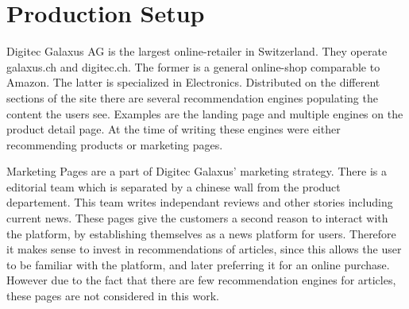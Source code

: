 \section{Production Setup}
Digitec Galaxus AG is the largest online-retailer in Switzerland.
They operate galaxus.ch and digitec.ch. The former is a general online-shop comparable to Amazon. 
The latter is specialized in Electronics.
Distributed on the different sections of the site there are several recommendation engines populating the content the users see.
Examples are the landing page and multiple engines on the product detail page.
At the time of writing these engines were either recommending products or marketing pages. 
\par
Marketing Pages are a part of Digitec Galaxus' marketing strategy.
There is a editorial team which is separated by a chinese wall from the product departement.
This team writes independant reviews and other stories including current news.
These pages give the customers a second reason to interact with the platform, by establishing themselves as a news platform for users.
Therefore it makes sense to invest in recommendations of articles, since this allows the user to be familiar with the platform, and later preferring it for an online purchase.
However due to the fact that there are few recommendation engines for articles, these pages are not considered in this work. 

